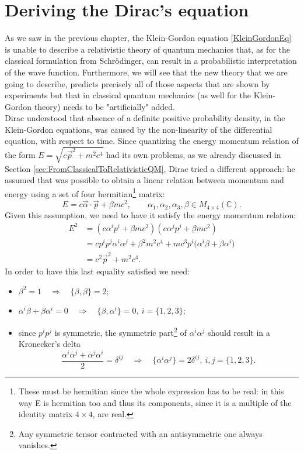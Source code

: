 \section{Deriving the Dirac's equation}
As we saw in the previous chapter, the Klein-Gordon equation \eqref{KleinGordonEq} is unable to describe a relativistic theory of quantum mechanics that, as for the classical formulation from Schrödinger, can result in a probabilistic interpretation of the wave function. Furthermore, we will see that the new theory that we are going to describe, predicts precisely all of those aspects that are shown by experiments but that in classical quantum mechanics (as well for the Klein-Gordon theory) needs to be "artificially" added.\\

Dirac understood that absence of a definite positive probability density, in the Klein-Gordon equations, was caused by the non-linearity of the differential equation, with respect to time. Since quantizing the energy momentum relation of the form $E=\sqrt{c\vec p^2+m^2c^4}$ had its own problems, as we already discussed in Section \ref{sec:FromClassicalToRelativisticQM}, Dirac tried a different approach: he assumed that was possible to obtain a linear relation between momentum and energy using a set of four hermitian\footnote{These must be hermitian since the whole expression has to be real: in this way E is hermitian too and thus its components, since it is a multiple of the identity matrix $4\times4$, are real.} matrix:
\begin{equation}\label{DiracAssumption}
    E=c\vec\alpha\cdot\vec p+\beta mc^2,\qquad \alpha_1,\alpha_2,\alpha_3,\beta\in M_{4\times4}(\mathbb{C}).
\end{equation}
Given this assumption, we need to have it satisfy the energy momentum relation:
\begin{align*}
    E^2&=(c\alpha^i p^i+\beta mc^2)(c\alpha^j p^j+\beta mc^2)\\&=cp^ip^j\alpha^i\alpha^j+\beta^2m^2c^4+mc^3p^i\bigl(\alpha^i\beta+\beta\alpha^i\bigr)\\&=c^2\vec p^2+m^2c^4.
\end{align*}
In order to have this last equality satisfied we need:
\begin{itemize}
    \item $\beta^2=1\quad \Rightarrow\quad \{\beta,\beta\}=2$;
    \item $\alpha^i\beta+\beta\alpha^i=0\quad \Rightarrow\quad \{\beta,\alpha^i\}=0,\ i=\{1,2,3\}$;
    \item since $p^ip^j$ is symmetric, the symmetric part\footnote{Any symmetric tensor contracted with an antisymmetric one always vanishes.} of $\alpha^i\alpha^j$ should result in a Kronecker's delta
    \begin{equation*}
        \frac{\alpha^i\alpha^j+\alpha^j\alpha^i}{2}=\delta^{ij}\quad \Rightarrow\quad \{\alpha^i\alpha^j\}=2\delta^{ij},\ i,j=\{1,2,3\}.
    \end{equation*}
\end{itemize}

